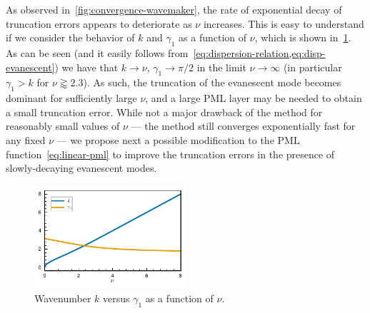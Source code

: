\documentclass[review,hidelinks,onefignum,onetabnum]{siamart220329}
\begin{document}
As observed in~\cref{fig:convergence-wavemaker}, the rate of exponential decay of truncation errors appears to deteriorate as $\nu$ increases. This is easy to understand if we consider the behavior of $k$ and $\gamma_1$ as a function of $\nu$, which is shown in~\cref{fig:propagative-vs-evanescent}. As can be seen (and it easily follows from~\cref{eq:dispersion-relation,eq:disp-evanescent}) we have that $k \to \nu$, $\gamma_1 \to \pi/2$ in the limit $\nu \to \infty$ (in particular $\gamma_1 > k$ for $\nu \gtrapprox 2.3$). As such, the truncation of the evanescent mode becomes dominant for sufficiently large $\nu$, and a large PML layer may be needed to obtain a small truncation error. While not a major drawback of the method for reasonably small values of $\nu$ --- the method still converges exponentially fast for any fixed $\nu$ --- we propose next a possible modification to the PML function~\cref{eq:linear-pml} to improve the truncation errors in the presence of slowly-decaying evanescent modes. 
%
\begin{figure}[ht]
  \centering
  \includegraphics[width=0.5\textwidth]{propagative_vs_evanescent.pdf}  
  \caption{Wavenumber $k$ versus $\gamma_1$ as a
  function of $\nu$.}
  \label{fig:propagative-vs-evanescent}
\end{figure}
\end{document}
